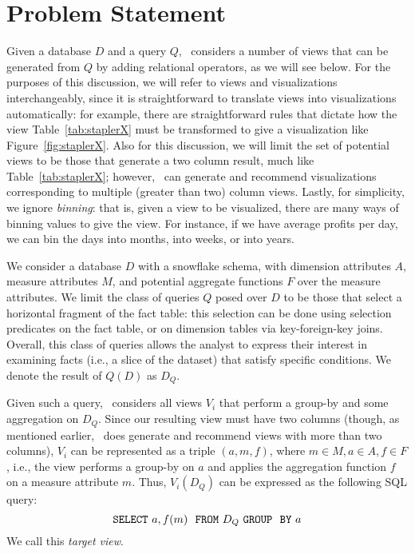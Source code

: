 

\section{Problem Statement}
\label{sec:problem_statement}

Given a database $D$ and a query $Q$, \SeeDB\ considers a number of views 
that can be generated from $Q$ by adding relational operators, as 
we will see below. 
For the purposes of this discussion, we will refer to views and visualizations
interchangeably, since it is straightforward to translate views into visualizations
automatically: for example, there are straightforward rules that dictate
how the view Table~\ref{tab:staplerX} must be transformed to give a visualization 
like Figure~\ref{fig:staplerX}.
Also for this discussion, we will limit the set of potential views to
be those that generate a two column result, much like Table~\ref{tab:staplerX};
however, \SeeDB\ can generate and recommend visualizations corresponding to
multiple (greater than two) column views.
Lastly, for simplicity, 
we ignore {\em binning}: that is, given a view to be visualized,
there are many ways of binning values to give the view. 
For instance, if we have average profits per day, we can bin the days into
months, into weeks, or into years.

We consider a database $D$ with a snowflake schema,
with dimension attributes $A$, measure attributes $M$, and potential
aggregate functions $F$ over the measure attributes.
We limit the class of queries $Q$ posed over $D$ to be
those that select a horizontal fragment of the fact table:
this selection can be done using selection predicates on the fact
table, or on dimension tables via key-foreign-key joins.
Overall, this class of queries allows the analyst to express their interest
in examining facts (i.e., a slice of the dataset)
that satisfy specific conditions.
We denote the result of $Q(D)$ as $D_Q$.

Given such a query, \SeeDB\ considers all views $V_i$
that perform a group-by and some aggregation on $D_Q$.
Since our resulting view must have two columns (though, as mentioned earlier,
\SeeDB\ does generate and recommend views with more than two columns),
$V_i$ can be represented as a triple $(a, m, f)$,
where $m \in M, a \in A, f \in F$, i.e., the view
performs a group-by on $a$ and applies the aggregation function $f$ on 
a measure attribute $m$.
Thus, $V_i (D_Q)$ can be expressed as the following SQL query:
$${\tt SELECT \ } a, f(m) \ \ {\tt FROM} \  D_Q\  {\tt GROUP \ \ BY} \ a$$
We call this {\em target view}. 

